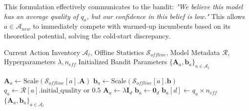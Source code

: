 This formulation effectively communicates to the bandit: \textit{"We believe this model has an average quality of $q_a$, but our confidence in this belief is low."} This allows $a \in \mathcal{A}_{new}$ to immediately compete with warmed-up incumbents based on its theoretical potential, solving the cold-start discrepancy.

\begin{algorithm}[t]
\caption{Cascading Initialization Strategy}
\label{alg:cascading_init}
\begin{algorithmic}[1]
\Require Current Action Inventory $\mathcal{A}_{t}$, Offline Statistics $\mathcal{S}_{offline}$, Model Metadata $\mathcal{R}$, Hyperparameters $\lambda, n_{eff}$
\Ensure Initialized Bandit Parameters $\{\mathbf{A}_a, \mathbf{b}_a\}_{a \in \mathcal{A}_t}$

        \State $\mathbf{A}_{a} \gets \text{Scale}(\mathcal{S}_{offline}[a].\mathbf{A})$ 
        \State $\mathbf{b}_{a} \gets \text{Scale}(\mathcal{S}_{offline}[a].\mathbf{b})$
    \Else
        \State $q_a \gets \mathcal{R}[a].\text{initial\_quality} \text{ or } 0.5$ 
        \State $\mathbf{A}_{a} \gets \lambda \mathbf{I}_d$
        \State $\mathbf{b}_{a} \gets \mathbf{0}_d$
        \State $\mathbf{b}_{a}[d] \gets q_a \times n_{eff}$ 
    \EndIf
\EndFor
\State \Return $\{\mathbf{A}_a, \mathbf{b}_a\}_{a \in \mathcal{A}_t}$
\end{algorithmic}
\end{algorithm}